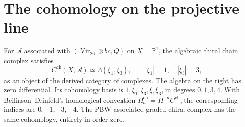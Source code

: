 \section{The cohomology on the projective line}

\begin{theorem}\label{thm:uc-global}
For $\mathcal A$ associated with $(\operatorname{Vir}_{26}\otimes bc,Q)$ on $X=\mathbb P^1$, the algebraic chiral chain complex satisfies
\begin{equation}\label{eq:uc-globalanswer}
 C^{\mathrm{ch}}(X,\mathcal A)\simeq\Lambda(\xi_1,\xi_3),
 \qquad |\xi_1|=1,\quad |\xi_3|=3,
\end{equation}
as an object of the derived category of complexes.
The algebra on the right has zero differential.
Its cohomology basis is $1,\xi_1,\xi_3,\xi_1\xi_3$, in degrees $0,1,3,4$.
With Beilinson--Drinfeld's homological convention $H_a^{\mathrm{ch}}=H^{-a}C^{\mathrm{ch}}$, the corresponding indices are $0,-1,-3,-4$.
The PBW associated graded chiral complex has the same cohomology, entirely in order zero.
\end{theorem}

